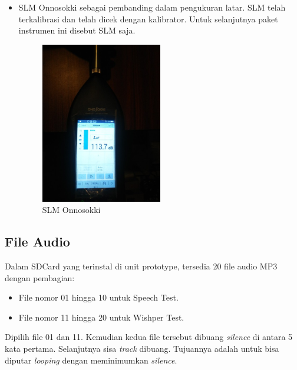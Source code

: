 \documentclass[12pt,]{article}
\begin{document}
\begin{itemize}
		\item SLM Onnosokki sebagai pembanding dalam pengukuran latar.
		SLM telah terkalibrasi dan telah dicek dengan kalibrator.
		Untuk selanjutnya paket instrumen ini disebut SLM saja.

		\begin{figure}[!ht]
			\centering
			\includegraphics[width=150pt]{images/slm_calib}
			\caption{SLM Onnosokki}
		\end{figure}
		
	\end{itemize}

	\subsection{File Audio}
	
	Dalam SDCard yang terinstal di unit prototype, tersedia 20 file audio MP3 dengan pembagian:
	\begin{itemize}
		\item File nomor 01 hingga 10 untuk Speech Test.
		\item File nomor 11 hingga 20 untuk Wishper Test.
	\end{itemize}
	
	Dipilih file 01 dan 11.
	Kemudian kedua file tersebut dibuang \textit{silence} di antara 5 kata pertama.
	Selanjutnya sisa \textit{track} dibuang.
	Tujuannya adalah untuk bisa diputar \textit{looping} dengan meminimumkan \textit{silence}.
\end{document}
